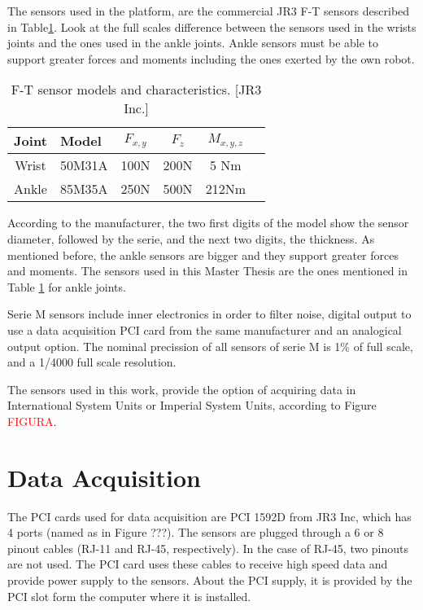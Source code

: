 The sensors used in the platform, are the commercial JR3 F-T sensors described in Table\ref{table:sensores}. Look at the full scales difference between the sensors used in the wrists joints and the ones used in the ankle joints. Ankle sensors must be able to support greater forces and moments including the ones exerted by the own robot.

\begin{table}[!hbt]
\centering
\begin{tabular}{|cl|c|c|c|c|}
\hline
Joint & Model & $F_{x,y}$ & $F_z$ & $M_{x,y,z}$\\
\hline
Wrist & 50M31A & 100N & 200N & 5 Nm\\ 
\hline
Ankle & 85M35A & 250N & 500N & 212Nm\\
\hline
\end{tabular}
\caption{F-T sensor models and characteristics. [JR3 Inc.]}
\label{table:sensores}
\end{table}

According to the manufacturer, the two first digits of the model show the sensor diameter, followed by the serie, and the next two digits, the thickness. As mentioned before, the ankle sensors are bigger and they support greater forces and moments. The sensors used in this Master Thesis are the ones mentioned in Table \ref{table:sensores} for ankle joints.

Serie M sensors include inner electronics in order to filter noise, digital output to use a data acquisition PCI card from the same manufacturer and an analogical output option. The nominal precission of all sensors of serie M is 1\% of full scale, and a 1/4000 full scale resolution.

The sensors used in this work, provide the option of acquiring data in International System Units or Imperial System Units, according to Figure \textcolor{red}{FIGURA}.

\section{Data Acquisition}
The PCI cards used for data acquisition are PCI 1592D from JR3 Inc, which has 4 ports (named as in Figure ???). The sensors are plugged through a 6 or 8 pinout cables (RJ-11 and RJ-45, respectively). In the case of RJ-45, two pinouts are not used. The PCI card uses these cables to receive high speed data and provide power supply to the sensors. About the PCI supply, it is provided by the PCI slot form the computer where it is installed.

